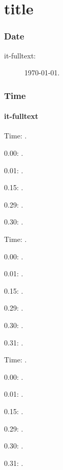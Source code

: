 \documentclass[italian,english]{article}
\begin{document}
\part{title}\section{Date}

\begin{description}
\item[it-fulltext:]
\today.
\end{description}

\section{Time}
\subsection{it-fulltext}
Time: \DTMcurrenttime.

0.00:  .

0.01:   . 

0.15:   . 

0.29:   . 

0.30:   .

Time: \DTMcurrenttime.

0.00:  .

0.01:   . 

0.15:   . 

0.29:   . 

0.30:   .

0.31:   .

Time: \DTMcurrenttime.

0.00:  .

0.01:   . 

0.15:   . 

0.29:   . 

0.30:   .

0.31:   .
\end{document}
